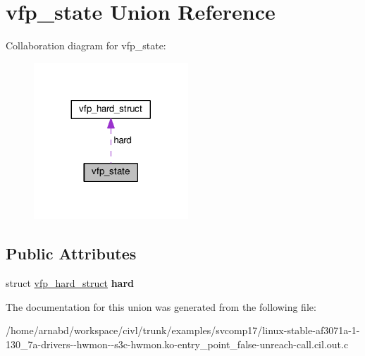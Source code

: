 \hypertarget{unionvfp__state}{}\section{vfp\+\_\+state Union Reference}
\label{unionvfp__state}


Collaboration diagram for vfp\+\_\+state\+:
\nopagebreak
\begin{figure}[H]
\begin{center}
\leavevmode
\includegraphics[width=164pt]{unionvfp__state__coll__graph}
\end{center}
\end{figure}
\subsection*{Public Attributes}
\begin{DoxyCompactItemize}
\item 
\hypertarget{unionvfp__state_a43ce7d41ce7de1ae19b0b00660902c9b}{}struct \hyperlink{structvfp__hard__struct}{vfp\+\_\+hard\+\_\+struct} {\bfseries hard}\label{unionvfp__state_a43ce7d41ce7de1ae19b0b00660902c9b}

\end{DoxyCompactItemize}


The documentation for this union was generated from the following file\+:\begin{DoxyCompactItemize}
\item 
/home/arnabd/workspace/civl/trunk/examples/svcomp17/linux-\/stable-\/af3071a-\/1-\/130\+\_\+7a-\/drivers-\/-\/hwmon-\/-\/s3c-\/hwmon.\+ko-\/entry\+\_\+point\+\_\+false-\/unreach-\/call.\+cil.\+out.\+c\end{DoxyCompactItemize}
